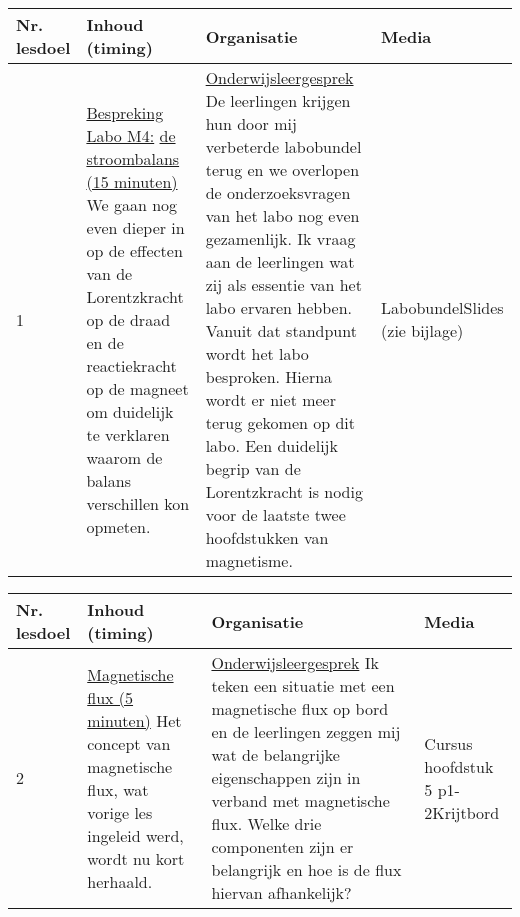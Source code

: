 \begin{landscape}
\newpage
	
	\begin{tabularx}{1.56\textwidth}{|p{1.5cm}|p{9cm}|X|p{4cm}|}
		\hline
		\textbf{Nr. lesdoel } & \textbf{Inhoud (timing)}  & \textbf{Organisatie } & \textbf{Media } \\ \hline
		1	&\underline{Bespreking Labo M4:} \underline{de stroombalans (15 minuten)}\newline
			 We gaan nog even dieper in op de effecten van de Lorentzkracht op de draad en de reactiekracht op de magneet om duidelijk te verklaren waarom de balans verschillen kon opmeten.
		&  \underline{Onderwijsleergesprek}\newline 
			De leerlingen krijgen hun door mij verbeterde labobundel terug en we overlopen de onderzoeksvragen van het labo nog even gezamenlijk. Ik vraag aan de leerlingen wat zij als essentie van het labo ervaren hebben. Vanuit dat standpunt wordt het labo besproken. Hierna wordt er niet meer terug gekomen op dit labo. Een duidelijk begrip van de Lorentzkracht is nodig voor de laatste twee hoofdstukken van magnetisme.
		&  Labobundel\newline\newline Slides (zie bijlage)
		\\ \hline
	\end{tabularx}\vspace{5mm}



\begin{tabularx}{1.56\textwidth}{|p{1.5cm}|p{9cm}|X|p{4cm}|}
	\hline
	\textbf{Nr. lesdoel } & \textbf{Inhoud (timing)}  & \textbf{Organisatie } & \textbf{Media } \\ \hline
    2\newline\newline 3& \underline{Magnetische flux (5 minuten)}\newline
    Het concept van magnetische flux, wat vorige les ingeleid werd, wordt nu kort herhaald.
	&  \underline{Onderwijsleergesprek}\newline  
	Ik teken een situatie met een magnetische flux op bord en de leerlingen zeggen mij wat de belangrijke eigenschappen zijn in verband met magnetische flux.	Welke drie componenten zijn er belangrijk en hoe is de flux hiervan afhankelijk?
	&  Cursus hoofdstuk 5 p1-2\newline\newline Krijtbord
	\\ \hline
\end{tabularx}\vspace{5mm}



\end{landscape}
